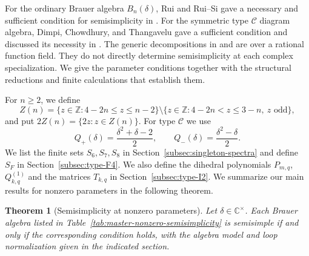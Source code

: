 \documentclass[11pt,a4paper]{amsart}
\newtheorem{mainresult}{Theorem}
\theoremstyle{uprightdefinition}
\theoremstyle{remark}\newtheorem{remark}[theorem]{Remark}
\begin{document}
For the ordinary Brauer algebra $B_n(\delta)$, Rui and Rui--Si gave a necessary and
sufficient condition for semisimplicity in \cite{Rui2005,RuiSi2006}. For the symmetric type
$\mathscr{C}$ diagram algebra, Dimpi, Chowdhury, and Thangavelu gave a sufficient
condition and discussed its necessity in \cite[Theorem~5.7 and
Remark~5.8]{TypeC2026}. The generic decompositions in
\cite{CFW2009} and \cite[Theorems~4.1--4.2]{LiuMorita2025}
are over a rational function field. They do not directly determine
semisimplicity at each complex specialization.
We give the parameter conditions together with the structural reductions
and finite calculations that establish them.

For $n\ge2$, we define
\begin{equation}\label{eq:Zn}
 Z(n)=\{z\in\mathbb Z:4-2n\le z\le n-2\}
 \setminus\{z\in\mathbb Z:4-2n<z\le3-n,\ z\text{ odd}\},
\end{equation}
and put $2Z(n)=\{2z:z\in Z(n)\}$. For type $\mathscr{C}$ we use
\begin{equation}\label{eq:Q}
 Q_+(\delta)=\frac{\delta^2+\delta-2}{2},\qquad
 Q_-(\delta)=\frac{\delta^2-\delta}{2}.
\end{equation}
We list the finite sets $S_6,S_7,S_8$ in
Section~\ref{subsec:singleton-spectra} and define $S_F$ in
Section~\ref{subsec:type-F4}. We also define the dihedral polynomials $P_{m,q}$,
$Q_{k,q}^{(1)}$ and the matrices $T_{k,q}$ in
Section~\ref{subsec:type-I2}. We summarize our main results for nonzero parameters in the following theorem.

\clearpage
\begin{mainresult}[Semisimplicity at nonzero parameters]
\label{thm:master-nonzero-semisimplicity}
Let $\delta\in\mathbb C^\times$. Each Brauer algebra listed in
Table~\ref{tab:master-nonzero-semisimplicity} is semisimple if and only
if the corresponding condition holds, with the algebra model and loop normalization
given in the indicated section.
\end{mainresult}
\end{document}
